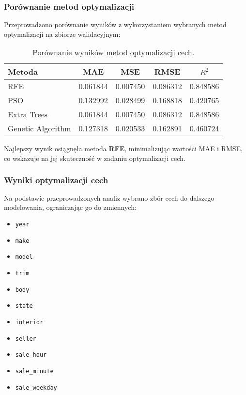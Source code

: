 \documentclass[10pt,letterpaper]{article}
\begin{document}
	\subsubsection{Porównanie metod optymalizacji}
	Przeprowadzono porównanie wyników z wykorzystaniem wybranych metod optymalizacji na zbiorze walidacyjnym:
	\begin{table}[H]
		\centering
		\begin{tabular}{lcccc}
			\hline
			\textbf{Metoda} & \textbf{MAE} & \textbf{MSE} & \textbf{RMSE} & \textbf{$R^2$} \\
			\hline
			RFE & 0.061844 & 0.007450 & 0.086312 & 0.848586 \\
			PSO & 0.132992 & 0.028499 & 0.168818 & 0.420765 \\
			Extra Trees & 0.061844 & 0.007450 & 0.086312 & 0.848586 \\
			Genetic Algorithm & 0.127318 & 0.020533 & 0.162891 & 0.460724 \\
			\hline
		\end{tabular}
		\caption{Porównanie wyników metod optymalizacji cech.}
		\label{tab:optimization_results}
	\end{table}
	
	Najlepszy wynik osiągnęła metoda \textbf{RFE}, minimalizując wartości MAE i RMSE, co wskazuje na jej skuteczność w zadaniu optymalizacji cech.
	
	\subsubsection{Wyniki optymalizacji cech}
	Na podstawie przeprowadzonych analiz wybrano zbór cech do dalszego modelowania, ograniczając go do zmiennych:
	\begin{itemize}
		\item \texttt{year}
		\item \texttt{make}
		\item \texttt{model}
		\item \texttt{trim}
		\item \texttt{body}
		\item \texttt{state}
		\item \texttt{interior}
		\item \texttt{seller}
		\item \texttt{sale\_hour}
		\item \texttt{sale\_minute}
		\item \texttt{sale\_weekday}
	\end{itemize}
	
\end{document}
